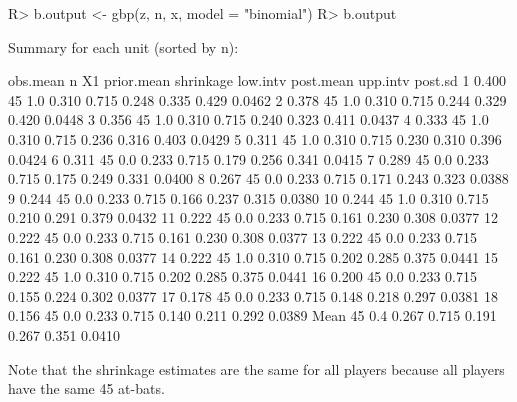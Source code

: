 \documentclass[article]{jss}
\begin{document}
\begin{CodeChunk}
\begin{CodeInput}
R> b.output <- gbp(z, n, x, model = "binomial")
R> b.output
\end{CodeInput}
\begin{CodeOutput}
Summary for each unit (sorted by n):

     obs.mean  n  X1 prior.mean shrinkage low.intv post.mean upp.intv post.sd
1       0.400 45 1.0      0.310     0.715    0.248     0.335    0.429  0.0462
2       0.378 45 1.0      0.310     0.715    0.244     0.329    0.420  0.0448
3       0.356 45 1.0      0.310     0.715    0.240     0.323    0.411  0.0437
4       0.333 45 1.0      0.310     0.715    0.236     0.316    0.403  0.0429
5       0.311 45 1.0      0.310     0.715    0.230     0.310    0.396  0.0424
6       0.311 45 0.0      0.233     0.715    0.179     0.256    0.341  0.0415
7       0.289 45 0.0      0.233     0.715    0.175     0.249    0.331  0.0400
8       0.267 45 0.0      0.233     0.715    0.171     0.243    0.323  0.0388
9       0.244 45 0.0      0.233     0.715    0.166     0.237    0.315  0.0380
10      0.244 45 1.0      0.310     0.715    0.210     0.291    0.379  0.0432
11      0.222 45 0.0      0.233     0.715    0.161     0.230    0.308  0.0377
12      0.222 45 0.0      0.233     0.715    0.161     0.230    0.308  0.0377
13      0.222 45 0.0      0.233     0.715    0.161     0.230    0.308  0.0377
14      0.222 45 1.0      0.310     0.715    0.202     0.285    0.375  0.0441
15      0.222 45 1.0      0.310     0.715    0.202     0.285    0.375  0.0441
16      0.200 45 0.0      0.233     0.715    0.155     0.224    0.302  0.0377
17      0.178 45 0.0      0.233     0.715    0.148     0.218    0.297  0.0381
18      0.156 45 0.0      0.233     0.715    0.140     0.211    0.292  0.0389
Mean          45 0.4      0.267     0.715    0.191     0.267    0.351  0.0410
\end{CodeOutput}
\end{CodeChunk}

Note that the shrinkage estimates are the same for all players because all players have the same 45 at-bats. %
\end{document}
